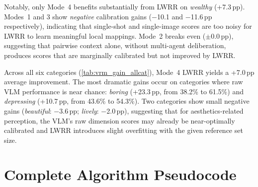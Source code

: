 \documentclass[runningheads]{llncs}
\begin{document}
Notably, only Mode~4 benefits substantially from LWRR on \emph{wealthy} (+7.3\,pp).
Modes~1 and 3 show \emph{negative} calibration gains ($-$10.1 and $-$11.6\,pp respectively), indicating that single-shot and single-image scores are too noisy for LWRR to learn meaningful local mappings.
Mode~2 breaks even ($\pm$0.0\,pp), suggesting that pairwise context alone, without multi-agent deliberation, produces scores that are marginally calibrated but not improved by LWRR.

Across all six categories (\cref{tab:vrm_gain_allcat}), Mode~4 LWRR yields a +7.0\,pp average improvement.
The most dramatic gains occur on categories where raw VLM performance is near chance: \emph{boring} (+23.3\,pp, from 38.2\% to 61.5\%) and \emph{depressing} (+10.7\,pp, from 43.6\% to 54.3\%).
Two categories show small negative gains (\emph{beautiful}: $-$3.6\,pp; \emph{lively}: $-$2.0\,pp), suggesting that for aesthetics-related perception, the VLM's raw dimension scores may already be near-optimally calibrated and LWRR introduces slight overfitting with the given reference set size.


\section{Complete Algorithm Pseudocode}
\label{sec:algorithm}
\end{document}
